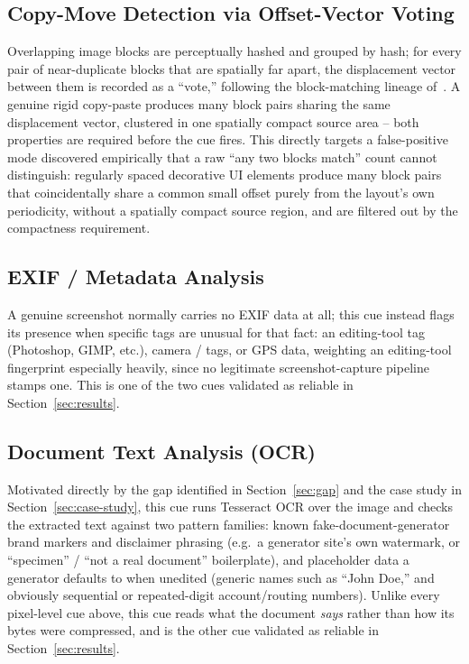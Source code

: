 \documentclass[conference]{IEEEtran}
\newcommand{\code}[1]{\path{#1}}
\begin{document}
\subsection{Copy-Move Detection via Offset-Vector Voting}
\label{sec:cue-copymove}
Overlapping image blocks are perceptually hashed and grouped by hash; for
every pair of near-duplicate blocks that are spatially far apart, the
displacement vector between them is recorded as a ``vote,'' following the
block-matching lineage of~\cite{fridrich2003copymove,popescu2004exposing}. A
genuine rigid copy-paste produces many block pairs sharing the same
displacement vector, clustered in one spatially compact source area -- both
properties are required before the cue fires. This directly targets a
false-positive mode discovered empirically that a raw ``any two blocks
match'' count cannot distinguish: regularly spaced decorative UI elements
produce many block pairs that coincidentally share a common small offset
purely from the layout's own periodicity, without a spatially compact source
region, and are filtered out by the compactness requirement.

\subsection{EXIF / Metadata Analysis}
A genuine screenshot normally carries no EXIF data at all; this cue instead
flags its presence when specific tags are unusual for that fact: an
editing-tool \code{Software} tag (Photoshop, GIMP, etc.), camera
\code{Make}/\code{Model} tags, or GPS data, weighting an editing-tool
fingerprint especially heavily, since no legitimate screenshot-capture
pipeline stamps one. This is one of the two cues validated as reliable in
Section~\ref{sec:results}.

\subsection{Document Text Analysis (OCR)}
\label{sec:cue-ocr}
Motivated directly by the gap identified in Section~\ref{sec:gap} and the
case study in Section~\ref{sec:case-study}, this cue runs Tesseract OCR over
the image and checks the extracted text against two pattern families: known
fake-document-generator brand markers and disclaimer phrasing (e.g.\ a
generator site's own watermark, or ``specimen'' / ``not a real document''
boilerplate), and placeholder data a generator defaults to when unedited
(generic names such as ``John Doe,'' and obviously sequential or
repeated-digit account/routing numbers). Unlike every pixel-level cue above,
this cue reads what the document \emph{says} rather than how its bytes were
compressed, and is the other cue validated as reliable in
Section~\ref{sec:results}.
\end{document}
